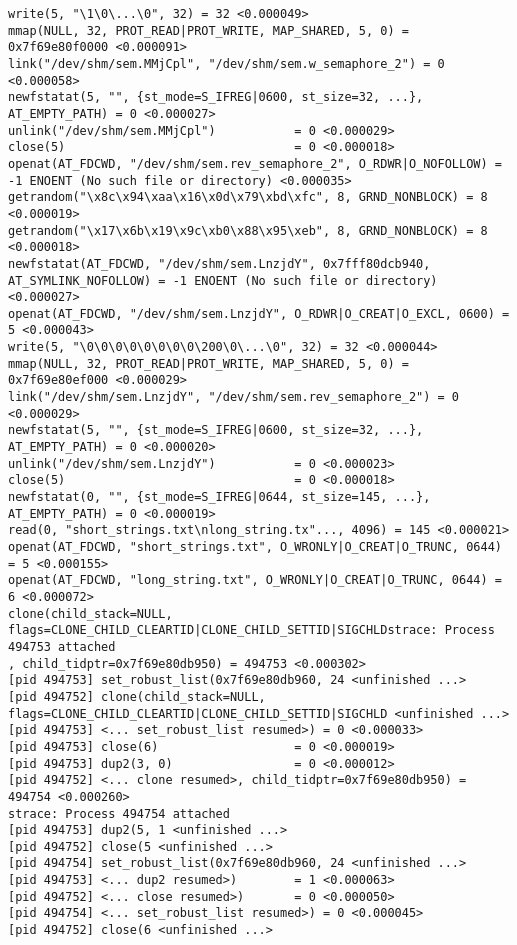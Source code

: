 \documentclass[a4paper, 12pt]{article}
\begin{document}
\begin{lstlisting}
write(5, "\1\0\...\0", 32) = 32 <0.000049>
mmap(NULL, 32, PROT_READ|PROT_WRITE, MAP_SHARED, 5, 0) = 0x7f69e80f0000 <0.000091>
link("/dev/shm/sem.MMjCpl", "/dev/shm/sem.w_semaphore_2") = 0 <0.000058>
newfstatat(5, "", {st_mode=S_IFREG|0600, st_size=32, ...}, AT_EMPTY_PATH) = 0 <0.000027>
unlink("/dev/shm/sem.MMjCpl")           = 0 <0.000029>
close(5)                                = 0 <0.000018>
openat(AT_FDCWD, "/dev/shm/sem.rev_semaphore_2", O_RDWR|O_NOFOLLOW) = -1 ENOENT (No such file or directory) <0.000035>
getrandom("\x8c\x94\xaa\x16\x0d\x79\xbd\xfc", 8, GRND_NONBLOCK) = 8 <0.000019>
getrandom("\x17\x6b\x19\x9c\xb0\x88\x95\xeb", 8, GRND_NONBLOCK) = 8 <0.000018>
newfstatat(AT_FDCWD, "/dev/shm/sem.LnzjdY", 0x7fff80dcb940, AT_SYMLINK_NOFOLLOW) = -1 ENOENT (No such file or directory) <0.000027>
openat(AT_FDCWD, "/dev/shm/sem.LnzjdY", O_RDWR|O_CREAT|O_EXCL, 0600) = 5 <0.000043>
write(5, "\0\0\0\0\0\0\0\0\200\0\...\0", 32) = 32 <0.000044>
mmap(NULL, 32, PROT_READ|PROT_WRITE, MAP_SHARED, 5, 0) = 0x7f69e80ef000 <0.000029>
link("/dev/shm/sem.LnzjdY", "/dev/shm/sem.rev_semaphore_2") = 0 <0.000029>
newfstatat(5, "", {st_mode=S_IFREG|0600, st_size=32, ...}, AT_EMPTY_PATH) = 0 <0.000020>
unlink("/dev/shm/sem.LnzjdY")           = 0 <0.000023>
close(5)                                = 0 <0.000018>
newfstatat(0, "", {st_mode=S_IFREG|0644, st_size=145, ...}, AT_EMPTY_PATH) = 0 <0.000019>
read(0, "short_strings.txt\nlong_string.tx"..., 4096) = 145 <0.000021>
openat(AT_FDCWD, "short_strings.txt", O_WRONLY|O_CREAT|O_TRUNC, 0644) = 5 <0.000155>
openat(AT_FDCWD, "long_string.txt", O_WRONLY|O_CREAT|O_TRUNC, 0644) = 6 <0.000072>
clone(child_stack=NULL, flags=CLONE_CHILD_CLEARTID|CLONE_CHILD_SETTID|SIGCHLDstrace: Process 494753 attached
, child_tidptr=0x7f69e80db950) = 494753 <0.000302>
[pid 494753] set_robust_list(0x7f69e80db960, 24 <unfinished ...>
[pid 494752] clone(child_stack=NULL, flags=CLONE_CHILD_CLEARTID|CLONE_CHILD_SETTID|SIGCHLD <unfinished ...>
[pid 494753] <... set_robust_list resumed>) = 0 <0.000033>
[pid 494753] close(6)                   = 0 <0.000019>
[pid 494753] dup2(3, 0)                 = 0 <0.000012>
[pid 494752] <... clone resumed>, child_tidptr=0x7f69e80db950) = 494754 <0.000260>
strace: Process 494754 attached
[pid 494753] dup2(5, 1 <unfinished ...>
[pid 494752] close(5 <unfinished ...>
[pid 494754] set_robust_list(0x7f69e80db960, 24 <unfinished ...>
[pid 494753] <... dup2 resumed>)        = 1 <0.000063>
[pid 494752] <... close resumed>)       = 0 <0.000050>
[pid 494754] <... set_robust_list resumed>) = 0 <0.000045>
[pid 494752] close(6 <unfinished ...>

\end{lstlisting}
\end{document}
